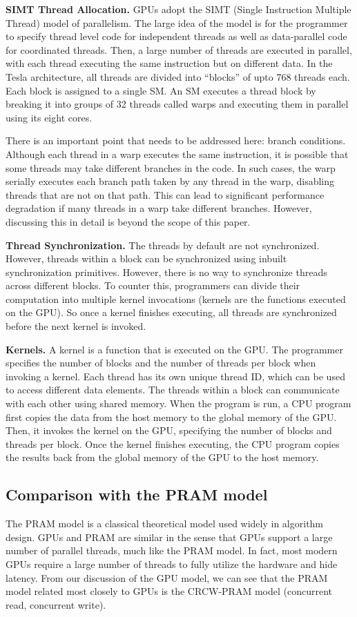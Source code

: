 \documentclass{article}
\begin{document}
\textbf{SIMT Thread Allocation.} GPUs adopt the SIMT (Single Instruction Multiple Thread) model of parallelism. The large idea of the model is for the programmer to specify thread level code for independent threads as well as data-parallel code for coordinated threads. Then, a large number of threads are executed in parallel, with each thread executing the same instruction but on different data. In the Tesla architecture, all threads are divided into ``blocks'' of upto 768 threads each. Each block is assigned to a single SM. An SM executes a thread block by breaking it into groups of 32 threads called warps and executing them in parallel using its eight cores.

There is an important point that needs to be addressed here: branch conditions. Although each thread in a warp executes the same instruction, it is possible that some threads may take different branches in the code. In such cases, the warp serially executes each branch path taken by any thread in the warp, disabling threads that are not on that path. This can lead to significant performance degradation if many threads in a warp take different branches. However, discussing this in detail is beyond the scope of this paper.

\textbf{Thread Synchronization.} The threads by default are not synchronized. However, threads within a block can be synchronized using inbuilt synchronization primitives. However, there is no way to synchronize threads across different blocks. To counter this, programmers can divide their computation into multiple kernel invocations (kernels are the functions executed on the GPU). So once a kernel finishes executing, all threads are synchronized before the next kernel is invoked.

\textbf{Kernels.} A kernel is a function that is executed on the GPU. The programmer specifies the number of blocks and the number of threads per block when invoking a kernel. Each thread has its own unique thread ID, which can be used to access different data elements. The threads within a block can communicate with each other using shared memory. When the program is run, a CPU program first copies the data from the host memory to the global memory of the GPU. Then, it invokes the kernel on the GPU, specifying the number of blocks and threads per block. Once the kernel finishes executing, the CPU program copies the results back from the global memory of the GPU to the host memory.

\vspace{0.2in}
\subsection{Comparison with the PRAM model}
The PRAM model is a classical theoretical model used widely in algorithm design. GPUs and PRAM are similar in the sense that GPUs support a large number of parallel threads, much like the PRAM model. In fact, most modern GPUs require a large number of threads to fully utilize the hardware and hide latency. From our discussion of the GPU model, we can see that the PRAM model related most closely to GPUs is the CRCW-PRAM model (concurrent read, concurrent write).
\end{document}
